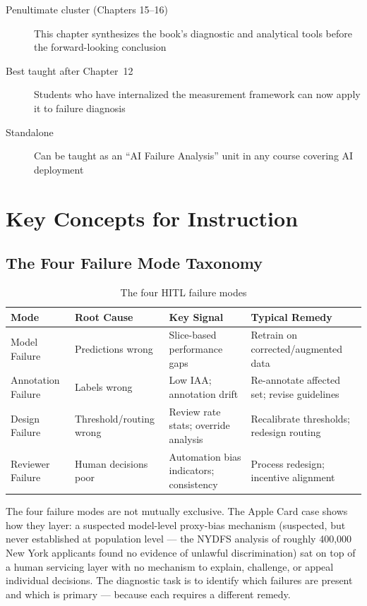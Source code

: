 \begin{description}
    \item[Penultimate cluster (Chapters 15--16)] This chapter synthesizes the book's diagnostic and analytical tools before the forward-looking conclusion
    \item[Best taught after Chapter~12] Students who have internalized the measurement framework can now apply it to failure diagnosis
    \item[Standalone] Can be taught as an ``AI Failure Analysis'' unit in any course covering AI deployment
\end{description}

\section{Key Concepts for Instruction}

\subsection{The Four Failure Mode Taxonomy}

\begin{table}[htbp]
\caption{The four HITL failure modes}
\label{tab:four-failure-modes}
\centering
\begin{tabular}{@{}p{2.5cm}p{2.5cm}p{3cm}p{3.5cm}@{}}
\toprule
\textbf{Mode} & \textbf{Root Cause} & \textbf{Key Signal} & \textbf{Typical Remedy} \\
\midrule
Model Failure & Predictions wrong & Slice-based performance gaps & Retrain on corrected/augmented data \\
Annotation Failure & Labels wrong & Low IAA; annotation drift & Re-annotate affected set; revise guidelines \\
Design Failure & Threshold/routing wrong & Review rate stats; override analysis & Recalibrate thresholds; redesign routing \\
Reviewer Failure & Human decisions poor & Automation bias indicators; consistency & Process redesign; incentive alignment \\
\bottomrule
\end{tabular}
\end{table}

\begin{keyconcept}
The four failure modes are not mutually exclusive. The Apple Card case shows how they layer: a suspected model-level proxy-bias mechanism (suspected, but never established at population level --- the NYDFS analysis of roughly 400,000 New York applicants found no evidence of unlawful discrimination) sat on top of a human servicing layer with no mechanism to explain, challenge, or appeal individual decisions. The diagnostic task is to identify which failures are present and which is primary --- because each requires a different remedy.
\end{keyconcept}


